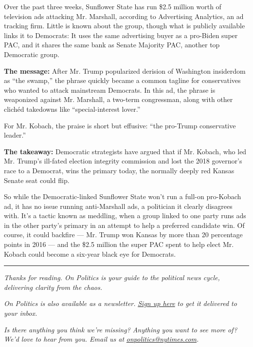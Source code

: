 Over the past three weeks, Sunflower State has run \$2.5 million worth
of television ads attacking Mr. Marshall, according to Advertising
Analytics, an ad tracking firm. Little is known about the group, though
what is publicly available links it to Democrats: It uses the same
advertising buyer as a pro-Biden super PAC, and it shares the same bank
as Senate Majority PAC, another top Democratic group.

\textbf{The message:} After Mr. Trump popularized derision of Washington
insiderdom as ``the swamp,'' the phrase quickly became a common tagline
for conservatives who wanted to attack mainstream Democrats. In this ad,
the phrase is weaponized against Mr. Marshall, a two-term congressman,
along with other clichéd takedowns like ``special-interest lover.''

For Mr. Kobach, the praise is short but effusive: ``the pro-Trump
conservative leader.''

\textbf{The takeaway:} Democratic strategists have argued that if Mr.
Kobach, who led Mr. Trump's ill-fated election integrity commission and
lost the 2018 governor's race to a Democrat, wins the primary today, the
normally deeply red Kansas Senate seat could flip.

So while the Democratic-linked Sunflower State won't run a full-on
pro-Kobach ad, it has no issue running anti-Marshall ads, a politician
it clearly disagrees with. It's a tactic known as meddling, when a group
linked to one party runs ads in the other party's primary in an attempt
to help a preferred candidate win. Of course, it could backfire --- Mr.
Trump won Kansas by more than 20 percentage points in 2016 --- and the
\$2.5 million the super PAC spent to help elect Mr. Kobach could become
a six-year black eye for Democrats.

\begin{center}\rule{0.5\linewidth}{\linethickness}\end{center}

\emph{Thanks for reading. On Politics is your guide to the political
news cycle, delivering clarity from the chaos.}

\emph{On Politics is also available as a newsletter.}
\href{https://www.nytimes.com/newsletters/politics}{\emph{Sign up here}}
\emph{to get it delivered to your inbox.}

\emph{Is there anything you think we're missing? Anything you want to
see more of? We'd love to hear from you. Email us at}
\href{mailto:onpolitics@nytimes.com}{\emph{onpolitics@nytimes.com}}\emph{.}

